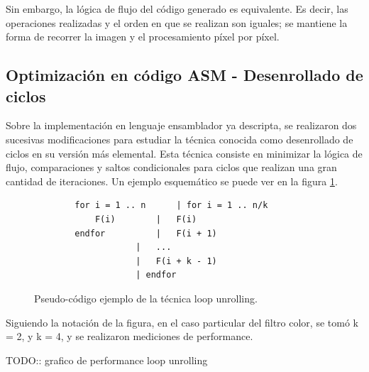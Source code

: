 Sin embargo, la lógica de flujo del código generado es equivalente. Es decir, las operaciones realizadas y el orden en que se realizan son iguales; se mantiene la forma de recorrer la imagen y el procesamiento píxel por píxel.

\subsection{Optimización en código ASM - Desenrollado de ciclos}
\label{sub:filtro-color-optimizaciones-asm}

Sobre la implementación en lenguaje ensamblador ya descripta, se realizaron dos sucesivas modificaciones para estudiar la técnica conocida como desenrollado de ciclos en su versión más elemental. Esta técnica consiste en minimizar la lógica de flujo, comparaciones y saltos condicionales para ciclos que realizan una gran cantidad de iteraciones. Un ejemplo esquemático se puede ver en la figura \ref{fig:filtro-color-loop-unrolling}.

\begin{figure}[h]
	\begin{mdframed}
	\begin{center}
		\begin{lstlisting}
		for i = 1 .. n		| for i = 1 .. n/k
			F(i)		| 	F(i)
		endfor			| 	F(i + 1)
					| 	...
					| 	F(i + k - 1)
					| endfor
		\end{lstlisting}
	\end{center}
	\end{mdframed}
	\caption{Pseudo-código ejemplo de la técnica loop unrolling.}
	\label{fig:filtro-color-loop-unrolling}
\end{figure}

Siguiendo la notación de la figura, en el caso particular del filtro color, se tomó k = 2, y k = 4, y se realizaron mediciones de performance.

TODO:: grafico de performance loop unrolling





